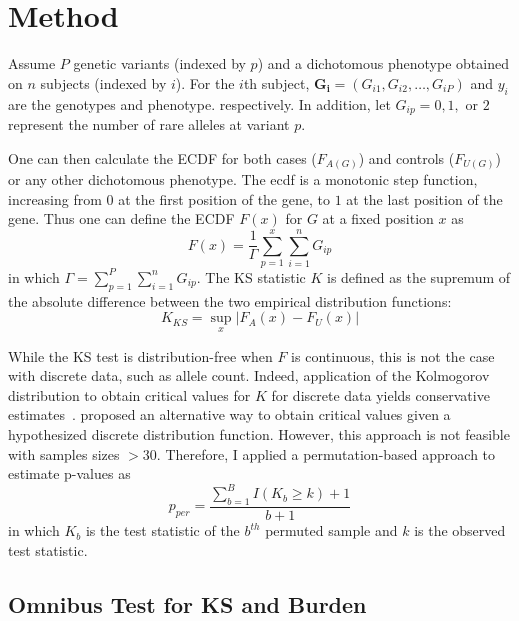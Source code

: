 \section{Method}
\label{sec:method_ksburden}

Assume $P$ genetic variants (indexed by $p$) and a dichotomous phenotype obtained on $n$ subjects (indexed by $i$).
For the $i$th subject,   $\bm{G_i} = (G_{i1}, G_{i2},\ldots , G_{iP})$ and $y_i$ are the genotypes and phenotype. respectively.
In addition, let $G_{ip} = 0, 1,$ or $2$ represent the number of rare alleles at variant $p$.

One can then calculate the \acrfull{ECDF} for both cases ($F_{A(G)}$) and controls ($F_{U(G)}$) or any other dichotomous phenotype.
The ecdf is a monotonic step function, increasing from $0$ at the first position of the gene, to $1$ at the last position of the gene.
Thus one can define the \acrlong{ECDF} $F(x)$ for $G$ at a fixed position $x$ as
\begin{equation}
  F(x) = \frac{1}{\Gamma} \sum^x_{p=1}\sum^n_{i=1}G_{ip}
\end{equation}
in which $\Gamma = \sum^P_{p=1}\sum^n_{i=1} G_{ip}$.
The KS statistic $K$ is defined as the supremum of the absolute difference between the two empirical distribution functions:
\begin{equation}
	K_{KS} = \sup_x | F_A(x) - F_U(x) |
\end{equation}

While the KS test is distribution-free when $F$ is continuous, this is not the case with discrete data, such as allele count.
Indeed, application of the Kolmogorov distribution to obtain critical values for $K$ for discrete data yields conservative estimates~\cite{Walsh1963,Conover1972}. 
\citet{Conover1972} proposed an alternative way to obtain critical values given a hypothesized discrete distribution function.
However, this approach is not feasible with samples sizes $>30$.
Therefore, I applied a permutation-based approach to estimate p-values as 
\begin{equation}
  p_{per} = \frac{\sum^B_{b=1} I(K_b \geq k)+1}{b+1}
\end{equation}
in which $K_b$ is the test statistic of the $b^{th}$ permuted sample and $k$ is the observed test statistic.

\subsection{Omnibus Test for KS and Burden}
\label{sub:omnibus_test_for_ks_and_burden}

